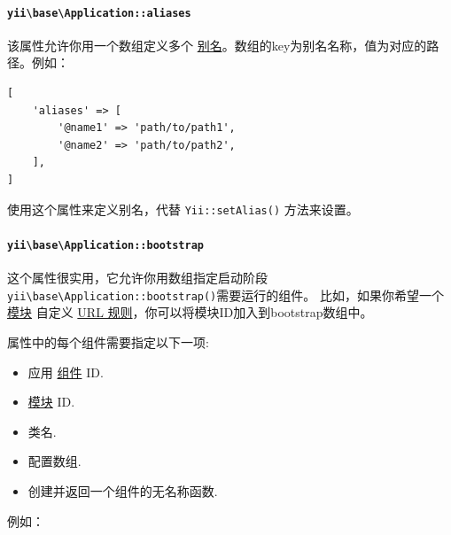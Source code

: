 \paragraph{\texttt{yii{\allowbreak{}\textbackslash}base{\allowbreak{}\textbackslash}Application\allowbreak{}::\allowbreak{}aliases} \label{structure-applications.md::aliases}}
该属性允许你用一个数组定义多个 \hyperref[concept-aliases.md]{别名}。数组的key为别名名称，值为对应的路径。例如：

\lstset{language=php}\begin{lstlisting}
[
    'aliases' => [
        '@name1' => 'path/to/path1',
        '@name2' => 'path/to/path2',
    ],
]
\end{lstlisting}
使用这个属性来定义别名，代替 \texttt{Yii\allowbreak{}::\allowbreak{}setAlias()} 方法来设置。

\paragraph{\texttt{yii{\allowbreak{}\textbackslash}base{\allowbreak{}\textbackslash}Application\allowbreak{}::\allowbreak{}bootstrap} \label{structure-applications.md::bootstrap}}
这个属性很实用，它允许你用数组指定启动阶段\texttt{yii{\allowbreak{}\textbackslash}base{\allowbreak{}\textbackslash}Application\allowbreak{}::\allowbreak{}bootstrap()}需要运行的组件。
比如，如果你希望一个 \hyperref[structure-modules.md]{模块} 自定义 \hyperref[runtime-url-handling.md]{URL 规则}，你可以将模块ID加入到bootstrap数组中。

属性中的每个组件需要指定以下一项:

\begin{itemize}
\item 应用 \hyperref[structure-applications.md::::components]{组件} ID.
\item \hyperref[structure-applications.md::::modules]{模块} ID.
\item 类名.
\item 配置数组.
\item 创建并返回一个组件的无名称函数.
\end{itemize}
例如：

